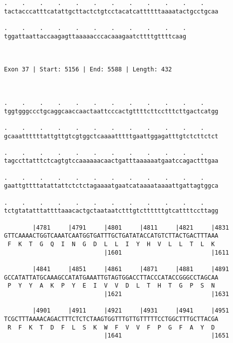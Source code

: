 \documentclass{article}
\begin{document}
\begin{Verbatim}
.    .    .    .    .    .    .    .    .    .    .    .    
tactacccatttcatattgcttactctgtcctacatcattttttaaaatactgcctgcaa
                                                            
.    .    .    .    .    .    .    .    .    .    .
tggattaattaccaagagttaaaaacccacaaagaatcttttgttttcaag
                                                   
                                                   
 
Exon 37 | Start: 5156 | End: 5588 | Length: 432



.    .    .    .    .    .    .    .    .    .    .    .    
tggtgggccctgcaggcaaccaactaattcccactgttttcttcctttcttgactcatgg
                                                            
.    .    .    .    .    .    .    .    .    .    .    .    
gcaaattttttattgttgtcgtggctcaaaatttttgaattggagatttgtctcttctct
                                                            
.    .    .    .    .    .    .    .    .    .    .    .    
tagccttatttctcagtgtccaaaaaacaactgatttaaaaaatgaatccagactttgaa
                                                            
.    .    .    .    .    .    .    .    .    .    .    .    
gaattgttttatattattctctctagaaaatgaatcataaaataaaattgattagtggca
                                                            
.    .    .    .    .    .    .    .    .    .    .    .    
tctgtatatttattttaaacactgctaataatctttgtcttttttgtcattttccttagg
                                                            
        |4781     |4791     |4801     |4811     |4821     |4831
GTTCAAAACTGGTCAAATCAATGGTGATTTGCTGATATACCATGTCTTACTGACTTTAAA
 F  K  T  G  Q  I  N  G  D  L  L  I  Y  H  V  L  L  T  L  K 
                            |1601                         |1611
  
        |4841     |4851     |4861     |4871     |4881     |4891
GCCATATTATGCAAAGCCATATGAAATTGTAGTGGACCTTACCCATACCGGGCCTAGCAA
 P  Y  Y  A  K  P  Y  E  I  V  V  D  L  T  H  T  G  P  S  N 
                            |1621                         |1631
  
        |4901     |4911     |4921     |4931     |4941     |4951
TCGCTTTAAAACAGACTTTCTCTCTAAGTGGTTTGTTGTTTTTCCTGGCTTTGCTTACGA
 R  F  K  T  D  F  L  S  K  W  F  V  V  F  P  G  F  A  Y  D 
                            |1641                         |1651
  

\end{Verbatim}
\end{document}
